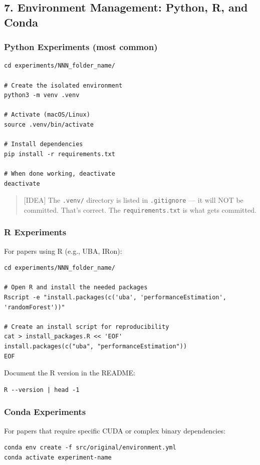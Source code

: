 \subsection{7. Environment Management: Python, R, and
Conda}\label{environment-management-python-r-and-conda}

\subsubsection{Python Experiments (most
common)}\label{python-experiments-most-common}

\begin{verbatim}
cd experiments/NNN_folder_name/

# Create the isolated environment
python3 -m venv .venv

# Activate (macOS/Linux)
source .venv/bin/activate

# Install dependencies
pip install -r requirements.txt

# When done working, deactivate
deactivate
\end{verbatim}

\begin{quote}
\small {[}IDEA{]} The \texttt{.venv/} directory is listed in
\texttt{.gitignore} --- it will NOT be committed.
That's correct. The \texttt{requirements.txt} is what
gets committed.
\end{quote}

\subsubsection{R Experiments}\label{r-experiments}

For papers using R (e.g., UBA, IRon):

\begin{verbatim}
cd experiments/NNN_folder_name/

# Open R and install the needed packages
Rscript -e "install.packages(c('uba', 'performanceEstimation', 'randomForest'))"

# Create an install script for reproducibility
cat > install_packages.R << 'EOF'
install.packages(c("uba", "performanceEstimation"))
EOF
\end{verbatim}

Document the R version in the README:

\begin{verbatim}
R --version | head -1
\end{verbatim}

\subsubsection{Conda Experiments}\label{conda-experiments}

For papers that require specific CUDA or complex binary dependencies:

\begin{verbatim}
conda env create -f src/original/environment.yml
conda activate experiment-name
\end{verbatim}
